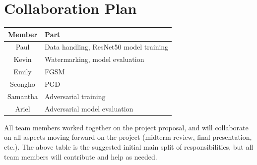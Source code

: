 \documentclass[sigconf, nonacm]{acmart}
\begin{document}
\section{Collaboration Plan}
\begin{table}[hb]%
  \begin{tabular}{cl}
    \toprule
    Member & Part\\
    \midrule
    Paul & Data handling, ResNet50 model training \\
    Kevin & Watermarking, model evaluation \\
    Emily & FGSM \\
    Seongho & PGD \\
    Samantha & Adversarial training \\
    Ariel & Adversarial model evaluation \\
  \bottomrule
\end{tabular}
\end{table}
All team members worked together on the project proposal, and will collaborate on all aspects moving forward on the project (midterm review, final presentation, etc.). The above table is the suggested initial main split of responsibilities, but all team members will contribute and help as needed. 



\end{document}

